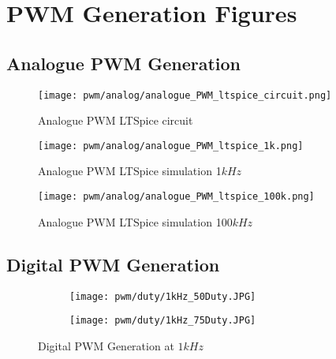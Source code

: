 \chapter{PWM Generation Figures} \label{A:PWM}

\section{Analogue PWM Generation} \label{A:analogue_PWM}


\begin{figure}[H]
    \texttt{[image: pwm/analog/analogue\_PWM\_ltspice\_circuit.png]}
    \caption{Analogue PWM LTSpice circuit}
\end{figure}

\begin{figure}[H]
    \texttt{[image: pwm/analog/analogue\_PWM\_ltspice\_1k.png]}
    \caption{Analogue PWM LTSpice simulation 1$kHz$}
\end{figure}

\begin{figure}[H]
    \texttt{[image: pwm/analog/analogue\_PWM\_ltspice\_100k.png]}
    \caption{Analogue PWM LTSpice simulation 100$kHz$}
\end{figure}


\section{Digital PWM Generation} \label{A:digital_PWM}

\begin{figure}[H]
    \centering
    \begin{subfigure}{0.45\textwidth}
        \texttt{[image: pwm/duty/1kHz\_50Duty.JPG]}

    \end{subfigure}
    \begin{subfigure}{0.45\textwidth}
        \texttt{[image: pwm/duty/1kHz\_75Duty.JPG]}

    \end{subfigure}
    \caption{Digital PWM Generation at $1kHz$}

\end{figure}

